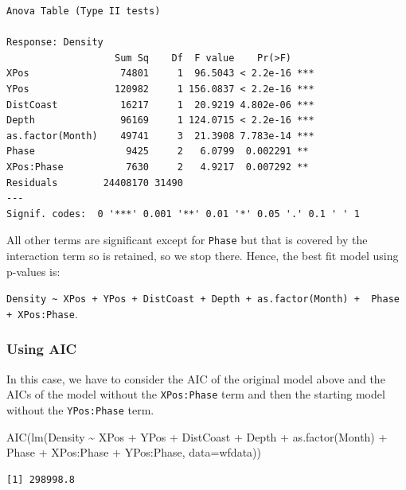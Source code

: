 \documentclass[
  oneside]{krantz}
\newenvironment{Shaded}{\begin{snugshade}}{\end{snugshade}}
\newcommand{\AttributeTok}[1]{\textcolor[rgb]{0.77,0.63,0.00}{#1}}
\newcommand{\FunctionTok}[1]{\textcolor[rgb]{0.00,0.00,0.00}{#1}}
\newcommand{\NormalTok}[1]{#1}
\newcommand{\SpecialCharTok}[1]{\textcolor[rgb]{0.00,0.00,0.00}{#1}}
\begin{document}
\begin{verbatim}
Anova Table (Type II tests)

Response: Density
                   Sum Sq    Df  F value    Pr(>F)    
XPos                74801     1  96.5043 < 2.2e-16 ***
YPos               120982     1 156.0837 < 2.2e-16 ***
DistCoast           16217     1  20.9219 4.802e-06 ***
Depth               96169     1 124.0715 < 2.2e-16 ***
as.factor(Month)    49741     3  21.3908 7.783e-14 ***
Phase                9425     2   6.0799  0.002291 ** 
XPos:Phase           7630     2   4.9217  0.007292 ** 
Residuals        24408170 31490                       
---
Signif. codes:  0 '***' 0.001 '**' 0.01 '*' 0.05 '.' 0.1 ' ' 1
\end{verbatim}

All other terms are significant except for \texttt{Phase} but that is covered by the interaction term so is retained, so we stop there. Hence, the best fit model using p-values is:

\texttt{Density\ \textasciitilde{}\ XPos\ +\ YPos\ +\ DistCoast\ +\ Depth\ +\ as.factor(Month)\ +\ \ Phase\ +\ XPos:Phase}.

\hypertarget{using-aic}{%
\subsubsection{Using AIC}\label{using-aic}}

In this case, we have to consider the AIC of the original model above and the AICs of the model without the \texttt{XPos:Phase} term and then the starting model without the \texttt{YPos:Phase} term.

\small

\begin{Shaded}
\begin{Highlighting}[]
\FunctionTok{AIC}\NormalTok{(}\FunctionTok{lm}\NormalTok{(Density }\SpecialCharTok{\textasciitilde{}}\NormalTok{ XPos }\SpecialCharTok{+}\NormalTok{ YPos }\SpecialCharTok{+}\NormalTok{ DistCoast }\SpecialCharTok{+}\NormalTok{ Depth }\SpecialCharTok{+} \FunctionTok{as.factor}\NormalTok{(Month) }\SpecialCharTok{+}  
\NormalTok{                     Phase }\SpecialCharTok{+}\NormalTok{ XPos}\SpecialCharTok{:}\NormalTok{Phase }\SpecialCharTok{+}\NormalTok{ YPos}\SpecialCharTok{:}\NormalTok{Phase, }\AttributeTok{data=}\NormalTok{wfdata))}
\end{Highlighting}
\end{Shaded}

\begin{verbatim}
[1] 298998.8
\end{verbatim}
\end{document}
